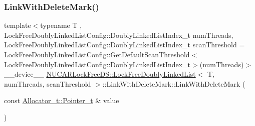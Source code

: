 \subsubsection{\texorpdfstring{Link\+With\+Delete\+Mark()}{LinkWithDeleteMark()}\hspace{0.1cm}{\footnotesize\ttfamily [4/5]}}
{\footnotesize\ttfamily template$<$typename T , Lock\+Free\+Doubly\+Linked\+List\+Config\+::\+Doubly\+Linked\+List\+Index\+\_\+t num\+Threads, Lock\+Free\+Doubly\+Linked\+List\+Config\+::\+Doubly\+Linked\+List\+Index\+\_\+t scan\+Threshold = Lock\+Free\+Doubly\+Linked\+List\+Config\+::\+Get\+Default\+Scan\+Threshold$<$\+Lock\+Free\+Doubly\+Linked\+List\+Config\+::\+Doubly\+Linked\+List\+Index\+\_\+t$>$(num\+Threads)$>$ \\
\+\_\+\+\_\+device\+\_\+\+\_\+ \mbox{\hyperlink{class_n_u_c_a_r_lock_free_d_s_1_1_lock_free_doubly_linked_list}{N\+U\+C\+A\+R\+Lock\+Free\+D\+S\+::\+Lock\+Free\+Doubly\+Linked\+List}}$<$ T, num\+Threads, scan\+Threshold $>$\+::Link\+With\+Delete\+Mark\+::\+Link\+With\+Delete\+Mark (\begin{DoxyParamCaption}\item[{const \mbox{\hyperlink{class_n_u_c_a_r_lock_free_d_s_1_1_allocator_a3931e84d06ddd3b436103475197eb12a}{Allocator\+\_\+t\+::\+Pointer\+\_\+t}} \&}]{value }\end{DoxyParamCaption})\hspace{0.3cm}{\ttfamily [inline]}}

\mbox{\label{class_n_u_c_a_r_lock_free_d_s_1_1_lock_free_doubly_linked_list_1_1_link_with_delete_mark_a7d7dfc1c8216fb02ed3ccaae5684eed3}} 
